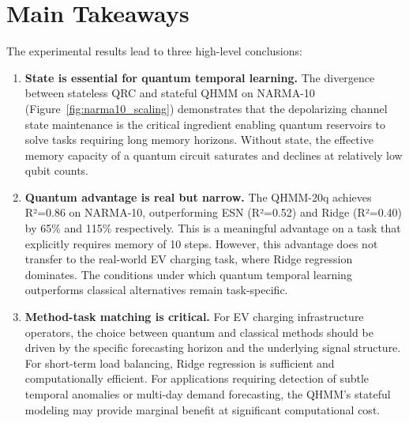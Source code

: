 
\section{Main Takeaways}


The experimental results lead to three high-level conclusions:


\begin{enumerate}
  \item \textbf{State is essential for quantum temporal learning.} The
    divergence between stateless QRC and stateful QHMM on NARMA-10
    (Figure~\ref{fig:narma10_scaling}) demonstrates that the depolarizing
    channel state maintenance is the critical ingredient enabling quantum
    reservoirs to solve tasks requiring long memory horizons. Without state,
    the effective memory capacity of a quantum circuit saturates and
    declines at relatively low qubit counts.


  \item \textbf{Quantum advantage is real but narrow.} The QHMM-20q
    achieves R²=0.86 on NARMA-10, outperforming ESN (R²=0.52) and
    Ridge (R²=0.40) by 65\% and 115\% respectively. This is a meaningful
    advantage on a task that explicitly requires memory of 10 steps.
    However, this advantage does not transfer to the real-world EV charging
    task, where Ridge regression dominates. The conditions under which
    quantum temporal learning outperforms classical alternatives remain
    task-specific.


  \item \textbf{Method-task matching is critical.} For EV charging
    infrastructure operators, the choice between quantum and classical
    methods should be driven by the specific forecasting horizon and
    the underlying signal structure. For short-term load balancing,
    Ridge regression is sufficient and computationally efficient. For
    applications requiring detection of subtle temporal anomalies or
    multi-day demand forecasting, the QHMM's stateful modeling may
    provide marginal benefit at significant computational cost.

\end{enumerate}

